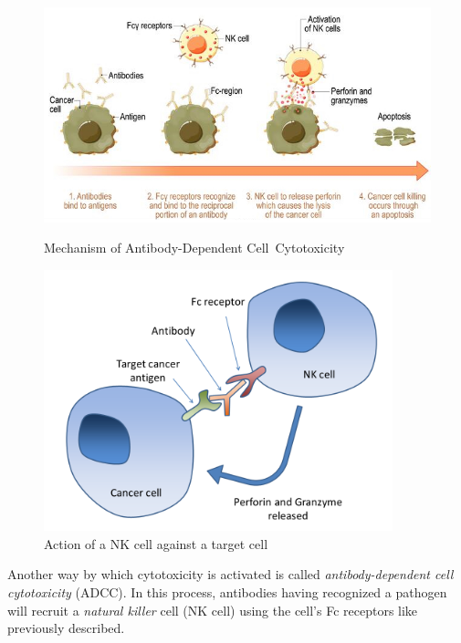 \begin{figure}[H]
    \centering
    \begin{minipage}{0.64\textwidth}
        \centering
        \includegraphics[width=\textwidth]{../Images/ADCC.jpg}
        \caption{Mechanism of Antibody-Dependent Cell~Cytotoxicity}
        \label{fig:ADCC}
    \end{minipage}\hfill
    \begin{minipage}{0.34\textwidth}
        \centering
        \includegraphics[width=0.9\textwidth]{../Images/Antibody-dependent_cell-mediated_cytotoxicity.png}   
        \caption{Action of a NK cell against a target cell}
        \label{fig:ADCC-NKcell}
    \end{minipage}
\end{figure}

Another way by which cytotoxicity is activated is called 
\emph{antibody-dependent cell cytotoxicity} (ADCC). In this process,
antibodies having recognized a pathogen will recruit a 
\emph{natural killer} cell (NK cell) using the cell's Fc receptors
like previously described.

